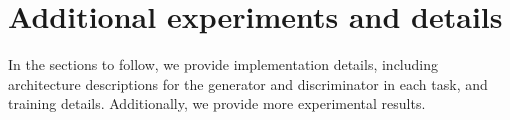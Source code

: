 \documentclass[10pt,twocolumn,letterpaper]{article}
\begin{document}


\section{Additional experiments and details}
In the sections to follow,  we provide implementation details, including architecture descriptions for the generator and discriminator in each task, and training details. Additionally, we provide more experimental results.


\end{document}
